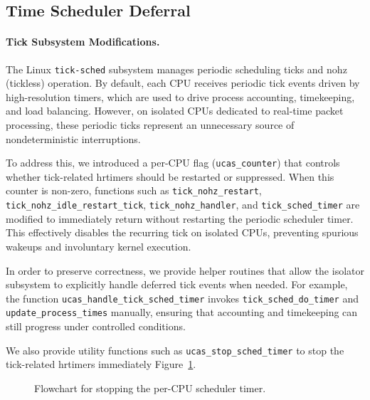 \documentclass[letterpaper]{article}
\begin{document}
\subsection{Time Scheduler Deferral}
\paragraph{Tick Subsystem Modifications.}
The Linux \texttt{tick-sched} subsystem manages periodic scheduling ticks and 
nohz (tickless) operation. By default, each CPU receives periodic tick events 
driven by high-resolution timers, which are used to drive process accounting, 
timekeeping, and load balancing. However, on isolated CPUs dedicated to 
real-time packet processing, these periodic ticks represent an unnecessary 
source of nondeterministic interruptions.

To address this, we introduced a per-CPU flag (\texttt{ucas\_counter}) that 
controls whether tick-related hrtimers should be restarted or suppressed. When 
this counter is non-zero, functions such as \texttt{tick\_nohz\_restart}, 
\texttt{tick\_nohz\_idle\_restart\_tick}, \texttt{tick\_nohz\_handler}, 
and \texttt{tick\_sched\_timer} are modified to immediately return without 
restarting the periodic scheduler timer. This effectively disables the 
recurring tick on isolated CPUs, preventing spurious wakeups and involuntary 
kernel execution.

In order to preserve correctness, we provide helper routines that allow the 
isolator subsystem to explicitly handle deferred tick events when needed. For 
example, the function \texttt{ucas\_handle\_tick\_sched\_timer} invokes 
\texttt{tick\_sched\_do\_timer} and \texttt{update\_process\_times} 
manually, ensuring that accounting and timekeeping can still progress under 
controlled conditions.

We also provide utility functions such as \texttt{ucas\_stop\_sched\_timer} to stop
the tick-related hrtimers immediately Figure~\ref{fig:stoptick}.

\begin{figure}[t]
\centering
{}
\caption{Flowchart for stopping the per-CPU scheduler timer.}
\label{fig:stoptick}
\end{figure}
\end{document}
